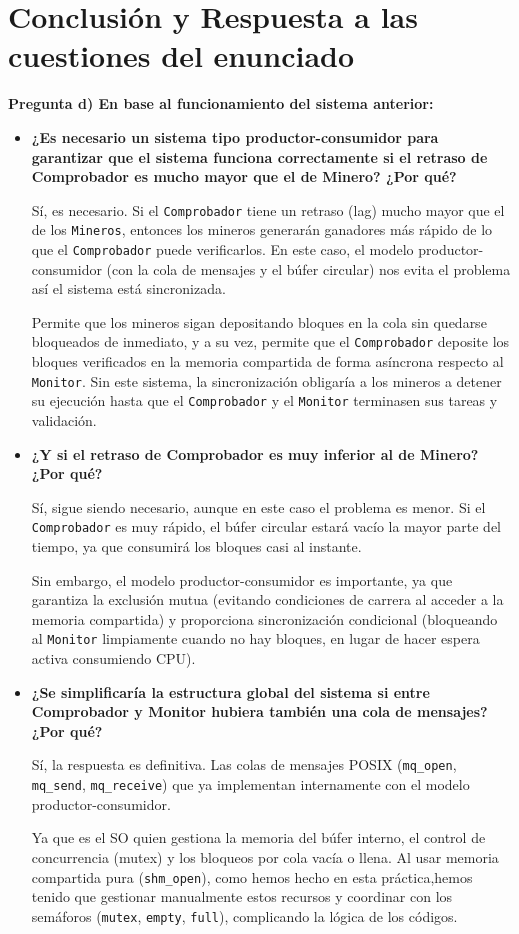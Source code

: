\documentclass[12pt,a4paper]{article}
\begin{document}
\section{Conclusión y Respuesta a las cuestiones del enunciado}
\textbf{Pregunta d) En base al funcionamiento del sistema anterior:}
\begin{itemize}
    \item \textbf{¿Es necesario un sistema tipo productor-consumidor para garantizar que el sistema funciona correctamente si el retraso de Comprobador es mucho mayor que el de Minero? ¿Por qué?}
    
    Sí, es necesario. Si el \texttt{Comprobador} tiene un retraso (lag) mucho mayor que el de los \texttt{Mineros}, entonces los mineros generarán ganadores más rápido de lo que el \texttt{Comprobador} puede verificarlos. 
    En este caso, el modelo productor-consumidor (con la cola de mensajes y el búfer circular) nos evita el problema así el sistema está sincronizada.
    
    
    Permite que los mineros sigan depositando bloques en la cola sin quedarse bloqueados de inmediato, y a su vez, permite que el \texttt{Comprobador} deposite los bloques verificados en la memoria compartida de 
    forma asíncrona respecto al \texttt{Monitor}.
    Sin este sistema, la sincronización obligaría a los mineros a detener su ejecución hasta que el \texttt{Comprobador} y el \texttt{Monitor} terminasen sus tareas y validación.

    \item \textbf{¿Y si el retraso de Comprobador es muy inferior al de Minero? ¿Por qué?}
    
    Sí, sigue siendo necesario, aunque en este caso el problema es menor. Si el \texttt{Comprobador} es muy rápido, 
    el búfer circular estará vacío la mayor parte del tiempo, ya que consumirá los bloques casi al instante.
    
    Sin embargo, el modelo productor-consumidor es importante, ya que garantiza la exclusión mutua 
    (evitando condiciones de carrera al acceder a la memoria compartida) y proporciona sincronización condicional (bloqueando al \texttt{Monitor} limpiamente cuando no hay bloques, en lugar de hacer espera activa consumiendo CPU). 

    \item \textbf{¿Se simplificaría la estructura global del sistema si entre Comprobador y Monitor hubiera también una cola de mensajes? ¿Por qué?}
    
    Sí, la respuesta es definitiva. Las colas de mensajes POSIX (\texttt{mq\_open}, \texttt{mq\_send}, \texttt{mq\_receive}) que ya implementan internamente con el modelo productor-consumidor. 
    
    
    Ya que es el SO quien gestiona la memoria del búfer interno, el control de concurrencia (mutex) y los bloqueos por cola vacía o llena. Al usar memoria compartida pura (\texttt{shm\_open}), 
    como hemos hecho en esta práctica,hemos tenido que gestionar manualmente estos recursos y coordinar con los semáforos (\texttt{mutex}, \texttt{empty}, \texttt{full}), complicando la lógica de los códigos.
\end{itemize}
\end{document}
